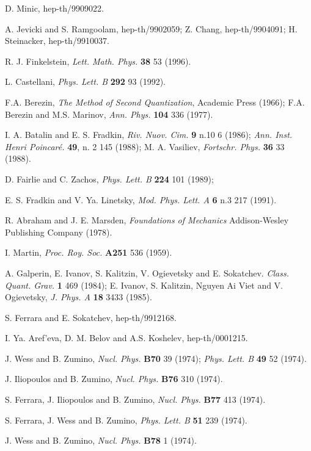 \documentclass[a4paper,12pt]{article}
\begin{document}
\begin{thebibliography}{100}
 D. Minic, hep-th/9909022.

 A. Jevicki and S. Ramgoolam, hep-th/9902059; Z. Chang,
hep-th/9904091;
H. Steinacker, hep-th/9910037.

 R. J. Finkelstein, {\it Lett. Math. Phys.} {\bf 38} 53
(1996).

 L. Castellani, {\it Phys. Lett. B} {\bf 292} 93 (1992).



 F.A. Berezin, {\it The Method of Second Quantization},
Academic Press (1966); F.A. Berezin and M.S. Marinov, {\it Ann. Phys.}
{\bf 104} 336 (1977).

 I. A. Batalin and E. S. Fradkin, {\it Riv. Nuov. Cim.} 
{\bf 9} n.10 6 (1986); {\it Ann. Inst.
Henri Poincar\'e.} {\bf 49}, n. 2 145 (1988); M. A. Vasiliev, {\it
Fortschr. Phys. } {\bf 36} 33  (1988).

 D. Fairlie and C. Zachos, {\it Phys. Lett. B}  {\bf 224} 101 (1989);


 E. S. Fradkin and V. Ya. Linetsky, {\it
Mod. Phys. Lett. A}  {\bf 6} n.3 217 (1991).

 R. Abraham and J. E. Marsden, {\it Foundations of
Mechanics} Addison-Wesley Publishing Company (1978).

 I.  Martin, {\it  Proc. Roy. Soc.} {\bf A251} 536  (1959).

 A. Galperin, E. Ivanov, S. Kalitzin, V. Ogievetsky and
 E. Sokatchev. {\it Class. Quant. Grav.} {\bf 1} 469  (1984); E. Ivanov,
 S. Kalitzin, Nguyen Ai Viet and V. Ogievetsky, {\it J. Phys. A} 
{\bf 18} 3433  (1985).

 S. Ferrara and E. Sokatchev, hep-th/9912168.

 I. Ya. Aref'eva, D. M. Belov and A.S. Koshelev,
hep-th/0001215.




 J. Wess and B. Zumino, {\it Nucl. Phys.} {\bf B70} 39 (1974); 
{\it Phys. Lett. B } {\bf 49} 52 (1974).

 J. Iliopoulos and B. Zumino, {\it Nucl. Phys.} {\bf B76} 310
(1974).

 S. Ferrara, J. Iliopoulos and B. Zumino, {\it Nucl. Phys.}
{\bf B77} 413 (1974).

 S. Ferrara, J. Wess and B. Zumino, {\it  Phys. Lett. B} {\bf
51} 239 (1974).

 J. Wess and B. Zumino, {\it Nucl. Phys.} {\bf B78} 1 (1974).


\end{thebibliography}
\end{document}

